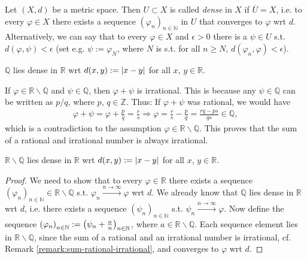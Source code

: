 \begin{defn}
	Let $(X, d)$ be a metric space. Then $U\subset X$ is called \textit{dense} in $X$ if $\overline{U} = X$, i.e. to every $\varphi\in X$ there exists a sequence $\left(\varphi_n\right)_{n\in\mathbb N}$ in $U$ that converges to $\varphi$ wrt $d$. Alternatively, we can say that to every $\varphi\in X$ and $\epsilon > 0$ there is a $\psi\in U$ s.t. $d(\varphi, \psi) < \epsilon$ (set e.g. $\psi := \varphi_N$, where $N$ is s.t. for all $n\geq N$, $d(\varphi_n, \varphi) < \epsilon$).
\end{defn}

\begin{exmp}
	$\mathbb Q$ lies dense in $\mathbb R$ wrt $d(x, y) := \abs{x - y}$ for all $x$, $y\in\mathbb R$.
\end{exmp}

\begin{theorem}\label{remark:sum-rational-irrational}
	If $\varphi\in\mathbb R\backslash \mathbb Q$ and $\psi\in\mathbb Q$, then $\varphi + \psi$ is irrational. This is because any $\psi \in \mathbb Q$ can be written as $p/q$, where $p$, $q\in\mathbb Z$. Thus: If $\varphi + \psi$ was rational, we would have
	\begin{align}
		\varphi + \psi = \varphi + \frac{p}{q} = \frac{r}{s} \Rightarrow \varphi = \frac{r}{s} - \frac{p}{q} = \frac{rq - ps}{qs} \in \mathbb Q,
	\end{align}
	which is a contradiction to the assumption $\varphi\in\mathbb R\backslash\mathbb Q$. This proves that the sum of a rational and irrational number is always irrational.
\end{theorem}

\begin{exmp}
	$\mathbb R\backslash \mathbb Q$ lies dense in $\mathbb R$ wrt $d(x, y) := \abs{x - y}$ for all $x$, $y\in\mathbb R$.
\end{exmp}

\begin{proof}
	We need to show that to every $\varphi\in \mathbb R$ there exists a sequence $\left(\varphi_n\right)_{n\in\mathbb N}\in \mathbb R\backslash \mathbb Q$ s.t. $\varphi_n\overset{n\to\infty}{\longrightarrow}\varphi$ wrt $d$. We already know that $\mathbb Q$ lies dense in $\mathbb R$ wrt $d$, i.e. there exists a sequence $\left(\psi_n\right)_{n\in\mathbb N}$ s.t. $\psi_n\overset{n\to\infty}{\longrightarrow}\varphi$. Now define the sequence $\seq[\varphi_n] := \seq[\psi_n + \frac{a}{n}]$, where $a\in\mathbb R\backslash \mathbb Q$. Each sequence element lies in $\mathbb R\backslash \mathbb Q$, since the sum of a rational and an irrational number is irrational, cf. Remark \ref{remark:sum-rational-irrational}, and converges to $\varphi$ wrt $d$.
\end{proof}

